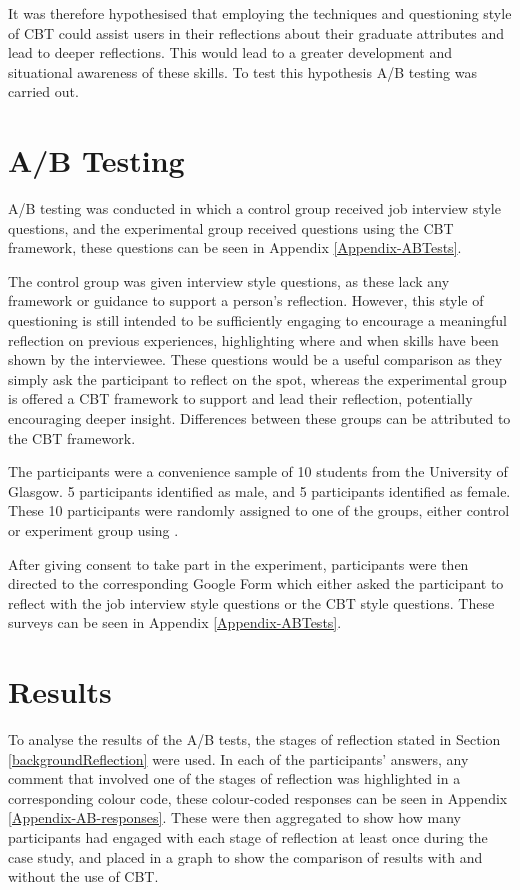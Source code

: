 \documentclass{l4proj}
\begin{document}
It was therefore hypothesised that employing the techniques and questioning style of CBT could assist users in their reflections about their graduate attributes and lead to deeper reflections. This would lead to a greater development and situational awareness of these skills. To test this hypothesis A/B testing was carried out.


\section{A/B Testing}

A/B testing was conducted in which a control group received job interview style questions, and the experimental group received questions using the CBT framework, these questions can be seen in Appendix \ref{Appendix-ABTests}. 

The control group was given interview style questions, as these lack any framework or guidance to support a person's reflection. However, this style of questioning is still intended to be sufficiently engaging to encourage a meaningful reflection on previous experiences, highlighting where and when skills have been shown by the interviewee. These questions would be a useful comparison as they simply ask the participant to reflect on the spot, whereas the experimental group is offered a CBT framework to support and lead their reflection, potentially encouraging deeper insight. Differences between these groups can be attributed to the CBT framework. 

The participants were a convenience sample of 10 students from the University of Glasgow. 5 participants identified as male, and 5 participants identified as female. These 10 participants were randomly assigned to one of the groups, either control or experiment group using \citet{random_lists_random_2013}.

After giving consent to take part in the experiment, participants were then directed to the corresponding Google Form which either asked the participant to reflect with the job interview style questions or the CBT style questions. These surveys can be seen in Appendix \ref{Appendix-ABTests}.

\section{Results}

To analyse the results of the A/B tests, the stages of reflection stated in Section \ref{backgroundReflection} were used. In each of the participants' answers, any comment that involved one of the stages of reflection was highlighted in a corresponding colour code, these colour-coded responses can be seen in Appendix \ref{Appendix-AB-responses}. These were then aggregated to show how many participants had engaged with each stage of reflection at least once during the case study, and placed in a graph to show the comparison of results with and without the use of CBT.
\end{document}
